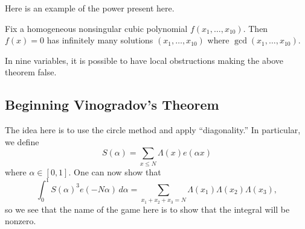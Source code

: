 \documentclass[../notes.tex]{subfiles}
\begin{document}
Here is an example of the power present here.
\begin{theorem}
	Fix a homogeneous nonsingular cubic polynomial $f(x_1,\ldots,x_{10})$. Then $f(x)=0$ has infinitely many solutions $(x_1,\ldots,x_{10})$ where $\gcd(x_1,\ldots,x_{10})$.
\end{theorem}
\begin{remark}
	In nine variables, it is possible to have local obstructions making the above theorem false.
\end{remark}

\subsection{Beginning Vinogradov's Theorem}
The idea here is to use the circle method and apply ``diagonality.'' In particular, we define
\[S(\alpha)=\sum_{x\le N}\Lambda(x)e(\alpha x)\]
where $\alpha\in[0,1]$. One can now show that
\[\int_0^1S(\alpha)^3e(-N\alpha)\,d\alpha=\sum_{x_1+x_2+x_3=N}\Lambda(x_1)\Lambda(x_2)\Lambda(x_3),\]
so we see that the name of the game here is to show that the integral will be nonzero.
\end{document}

